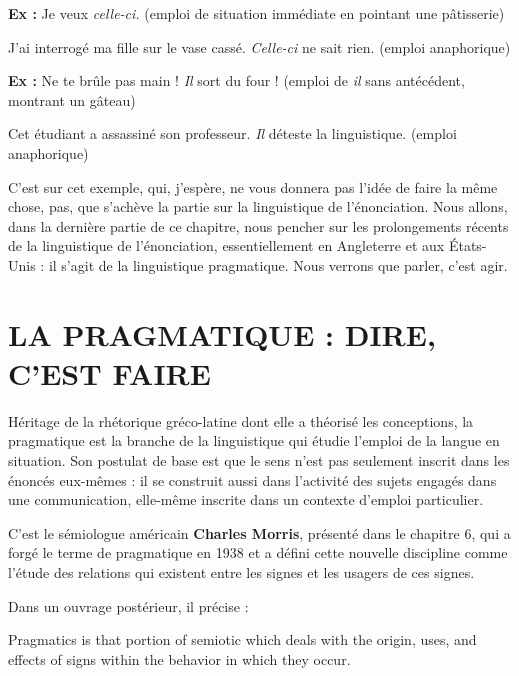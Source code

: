 \textbf{Ex :} Je veux \textit{celle-ci.} (emploi de situation immédiate en pointant une pâtisserie)

\hspace*{1.5em}J’ai interrogé ma fille sur le vase cassé. \textit{Celle-ci} ne sait rien. (emploi anaphorique)

\textbf{Ex :} Ne te brûle pas main ! \textit{Il} sort du four ! (emploi de \textit{il} sans antécédent, montrant un gâteau)

\hspace*{1.5em}Cet étudiant a assassiné son professeur. \textit{Il} déteste la linguistique. (emploi anaphorique)

C’est sur cet exemple, qui, j’espère, ne vous donnera pas l’idée de faire la même chose, pas, que s’achève la partie sur la linguistique de l’énonciation. Nous allons, dans la dernière partie de ce chapitre, nous pencher sur les prolongements récents de la linguistique de l’énonciation, essentiellement en Angleterre et aux États-Unis : il s’agit de la linguistique pragmatique. Nous verrons que parler, c’est agir.

\section{LA PRAGMATIQUE : DIRE, C’EST FAIRE}
Héritage de la rhétorique gréco-latine dont elle a théorisé les conceptions, la pragmatique est la branche de la linguistique qui étudie l’emploi de la langue en situation. Son postulat de base est que le sens n’est pas seulement inscrit dans les énoncés eux-mêmes : il se construit aussi dans l’activité des sujets engagés dans une communication, elle-même inscrite dans un contexte d’emploi particulier.

C’est le sémiologue américain \textbf{Charles Morris}, présenté dans le chapitre 6, qui a forgé le terme de pragmatique en 1938 et a défini cette nouvelle discipline comme l’étude des relations qui existent entre les signes et les usagers de ces signes.

Dans un ouvrage postérieur, il précise :
\begin{lecture}{}
Pragmatics is that portion of semiotic which deals with the origin, uses, and effects of signs within the behavior in which they occur.
\end{lecture}

